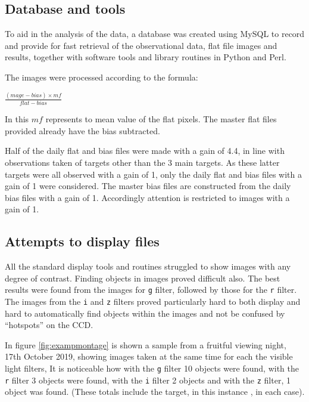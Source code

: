 \subsection{Database and tools}
\protect\label{section:database}

To aid in the analysis of the data, a database was created using MySQL to
record and provide for fast retrieval of the observational data, flat file
images and results, together with software tools and library routines in Python
and Perl.

The images were processed according to the formula:

\begin{center}
$ \frac{(mage - bias) \times mf}{flat - bias}$
\end{center}

In this $mf$ represents to mean value of the flat pixels. The master flat files
provided already have the bias subtracted.

Half of the daily flat and bias files were made with a gain of 4.4, in line with
observations taken of targets other than the 3 main {\rdwarf} targets. As these
latter targets were all observed with a gain of 1, only the daily flat and bias
files with a gain of 1 were considered. The master bias files are
constructed from the daily bias files with a gain of 1. Accordingly attention is
restricted to images with a gain of 1.

\subsection{Attempts to display files}

All the standard display tools and routines struggled to show images with any
degree of contrast. Finding objects in images proved difficult also. The
best results were found from the images for \texttt{g} filter, followed by
those for the \texttt{r} filter. The images from the \texttt{i} and \texttt{z}
filters proved particularly hard to both display and hard to automatically find
objects within the images and not be confused by ``hotspots'' on the CCD.

In figure \ref{fig:exampmontage} is shown a sample from a fruitful viewing
night, 17th October 2019, showing images taken at the same time for each the
visible light filters, It is noticeable how with the \texttt{g} filter 10 objects
were found, with the \texttt{r} filter 3 objects were found, with the \texttt{i}
filter 2 objects and with the \texttt{z} filter, 1 object was found. (These
totals include the target, in this instance \bstar, in each case).

